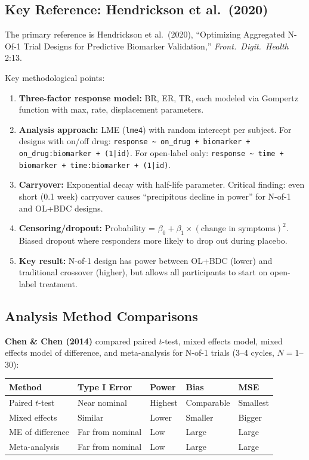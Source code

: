 \documentclass[11pt]{article}
\begin{document}
\subsection{Key Reference: Hendrickson et al.\ (2020)}

The primary reference is Hendrickson et al.\ (2020), ``Optimizing
Aggregated N-Of-1 Trial Designs for Predictive Biomarker Validation,''
\textit{Front.\ Digit.\ Health} 2:13.

Key methodological points:
\begin{enumerate}[nosep]
\item \textbf{Three-factor response model:} BR, ER, TR, each modeled
  via Gompertz function with max, rate, displacement parameters.
\item \textbf{Analysis approach:} LME (\texttt{lme4}) with random
  intercept per subject. For designs with on/off drug:
  \texttt{response \textasciitilde{} on\_drug + biomarker +
  on\_drug:biomarker + (1|id)}. For open-label only:
  \texttt{response \textasciitilde{} time + biomarker +
  time:biomarker + (1|id)}.
\item \textbf{Carryover:} Exponential decay with half-life parameter.
  Critical finding: even short (0.1 week) carryover causes
  ``precipitous decline in power'' for N-of-1 and OL+BDC designs.
\item \textbf{Censoring/dropout:} Probability =
  $\beta_0 + \beta_1 \times (\text{change in symptoms})^2$. Biased
  dropout where responders more likely to drop out during placebo.
\item \textbf{Key result:} N-of-1 design has power between OL+BDC
  (lower) and traditional crossover (higher), but allows all
  participants to start on open-label treatment.
\end{enumerate}

\subsection{Analysis Method Comparisons}

\textbf{Chen \& Chen (2014)} compared paired $t$-test, mixed effects
model, mixed effects model of difference, and meta-analysis for N-of-1
trials (3--4 cycles, $N = 1$--30):

\begin{table}[h]
\centering
\begin{tabular}{@{}lllll@{}}
\toprule
Method & Type I Error & Power & Bias & MSE \\
\midrule
Paired $t$-test & Near nominal & Highest & Comparable & Smallest \\
Mixed effects & Similar & Lower & Smaller & Bigger \\
ME of difference & Far from nominal & Low & Large & Large \\
Meta-analysis & Far from nominal & Low & Large & Large \\
\bottomrule
\end{tabular}
\end{table}
\end{document}
